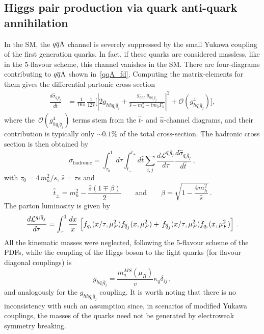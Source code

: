 \subsection{Higgs pair production via quark anti-quark annihilation}
In the SM, the $\qqA$ channel is severely suppressed by the small Yukawa coupling of the first generation quarks.  In fact, if  these quarks are considered massless, like in the 5-flavour scheme, this channel vanishes in the SM.  There are four-diagrams contributing to $\qqA$ shown in~\autoref{qqA_fd}. Computing the matrix-elements for them gives the differential partonic cross-section 
\begin{align}
	\frac{d \hat \sigma_{q_i\bar{q}_j}}{d \hat t} &= \frac{1}{16 \pi}\, \frac{1}{12  \hat{s}} \bigg[ \left| 2  g_{hh q_i \bar q_j} + \frac{g_{hhh}\, g_{h q_i \bar q_j}}{\hat{s}-m_h^2-im_h\Gamma_h}\right|^2+ \mathcal{O}(g_{h q_i \bar q_j}^4) \bigg],
	\label{sigmaqqa}
\end{align}
where the~$ \mathcal{O}(g_{h q_i \bar q_j}^4)$ terms stem from the $\hat{t}$- and $\hat{u}$-channel diagrams, and their contribution is typically only $\sim 0.1 \%$ of the total cross-section.
The hadronic cross section is then obtained by
\begin{equation}
	\sigma_{\mathrm{hadronic}} =  \int_{\tau_0}^1 d\tau \int_{\hat{t}_-}^{\hat{t}_+} d\hat{t} \sum_{i,j} \frac{d\mathcal{L}^{q_i\bar{q}_j}}{d\tau}\frac{ d\hat \sigma_{q_i\bar{q}_j}}{d \hat t}\,, \label{eq:sigmahadron}
\end{equation}
with $ \tau_0= 4\, m_h^2/s$, $\hat{s}=\tau s$ and
\begin{equation}
	\hat{t}_{\pm}=m_h^2-\frac{\hat{s}(1\mp \beta)}{2} \quad\quad \text{and}\quad \quad \beta=\sqrt{1-\frac{4 m_h^2}{\hat{s}}}\,.
\end{equation}
The parton luminosity is given by
\begin{equation}
	\frac{d{\cal L}^{q_i \bar q_j}}{d\tau} = \int_\tau ^1 \frac{dx}{x} \,\left[  f_{q_i}(x/\tau,\mu_F^2) f_{\bar{q}_j}(x,\mu_F^2) + \,f_{\bar{q}_j}(x/\tau,\mu_F^2) f_{q_i}(x,\mu_F^2)\right]\,.
\end{equation}
All the kinematic masses were neglected, following the 5-flavour scheme of the PDFs, while the coupling of the Higgs boson to the light quarks (for flavour diagonal couplings) is
\begin{equation}
	g_{hq_i\bar{q}_j}=\frac{m^{\bar{MS}}_q(\mu_R)}{v}  \kappa_q \delta_{ij}\,,
\end{equation}
and analogously for the $g_{hhq_i\bar{q}_j}$ coupling.  It is worth noting that there is no inconsistency with such an assumption since, in scenarios of modified Yukawa couplings, the masses of the quarks need not be generated by electroweak symmetry breaking.
